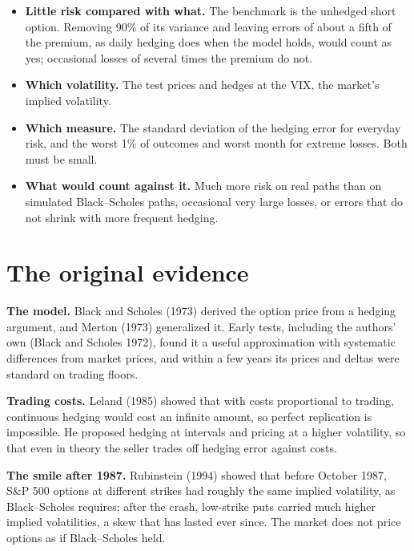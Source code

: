 \begin{itemize}
  \item \textbf{Little risk compared with what.} The benchmark is the unhedged short option. Removing 90\% of its variance and leaving errors of about a fifth of the premium, as daily hedging does when the model holds, would count as yes; occasional losses of several times the premium do not.
  \item \textbf{Which volatility.} The test prices and hedges at the VIX, the market's implied volatility.
  \item \textbf{Which measure.} The standard deviation of the hedging error for everyday risk, and the worst 1\% of outcomes and worst month for extreme losses. Both must be small.
  \item \textbf{What would count against it.} Much more risk on real paths than on simulated Black--Scholes paths, occasional very large losses, or errors that do not shrink with more frequent hedging.
\end{itemize}

\section{The original evidence}
\label{sec:14-evidence}

\textbf{The model.} Black and Scholes (1973) derived the option price from a hedging argument, and Merton (1973) generalized it. Early tests, including the authors' own (Black and Scholes 1972), found it a useful approximation with systematic differences from market prices, and within a few years its prices and deltas were standard on trading floors.

\textbf{Trading costs.} Leland (1985) showed that with costs proportional to trading, continuous hedging would cost an infinite amount, so perfect replication is impossible. He proposed hedging at intervals and pricing at a higher volatility, so that even in theory the seller trades off hedging error against costs.

\textbf{The smile after 1987.} Rubinstein (1994) showed that before October 1987, S\&P 500 options at different strikes had roughly the same implied volatility, as Black--Scholes requires; after the crash, low-strike puts carried much higher implied volatilities, a skew that has lasted ever since. The market does not price options as if Black--Scholes held.

